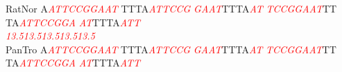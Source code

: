 \documentclass[11pt,twoside,reqno,a4paper]{article}
\begin{document}
{RatNor	A\textit{\textcolor{red}{A}}\textit{\textcolor{red}{T}}\textit{\textcolor{red}{T}}\textit{\textcolor{red}{C}}\textit{\textcolor{red}{C}}\textit{\textcolor{red}{G}}\textit{\textcolor{red}{G}}\textit{\textcolor{red}{A}}\textit{\textcolor{red}{A}}\textit{\textcolor{red}{T}}	TTTA\textit{\textcolor{red}{A}}\textit{\textcolor{red}{T}}\textit{\textcolor{red}{T}}\textit{\textcolor{red}{C}}\textit{\textcolor{red}{C}}\textit{\textcolor{red}{G}}	\textit{\textcolor{red}{G}}\textit{\textcolor{red}{A}}\textit{\textcolor{red}{A}}\textit{\textcolor{red}{T}}TTTA\textit{\textcolor{red}{A}}\textit{\textcolor{red}{T}}	\textit{\textcolor{red}{T}}\textit{\textcolor{red}{C}}\textit{\textcolor{red}{C}}\textit{\textcolor{red}{G}}\textit{\textcolor{red}{G}}\textit{\textcolor{red}{A}}\textit{\textcolor{red}{A}}\textit{\textcolor{red}{T}}TT	TA\textit{\textcolor{red}{A}}\textit{\textcolor{red}{T}}\textit{\textcolor{red}{T}}\textit{\textcolor{red}{C}}\textit{\textcolor{red}{C}}\textit{\textcolor{red}{G}}\textit{\textcolor{red}{G}}\textit{\textcolor{red}{A}}	\textit{\textcolor{red}{A}}\textit{\textcolor{red}{T}}TTTA\textit{\textcolor{red}{A}}\textit{\textcolor{red}{T}}\textit{\textcolor{red}{T}}\\
\hspace*{7\charwidth}\hspace*{1\charwidth}\textit{\textcolor{red}{13.5}}\hspace*{1\charwidth}\hspace*{10\charwidth}\textit{\textcolor{red}{13.5}}\hspace*{1\charwidth}\hspace*{10\charwidth}\textit{\textcolor{red}{13.5}}\hspace*{1\charwidth}\hspace*{1\charwidth}\hspace*{10\charwidth}\textit{\textcolor{red}{13.5}}\hspace*{1\charwidth}\hspace*{10\charwidth}\textit{\textcolor{red}{13.5}}\hspace*{1\charwidth}\\
PanTro	A\textit{\textcolor{red}{A}}\textit{\textcolor{red}{T}}\textit{\textcolor{red}{T}}\textit{\textcolor{red}{C}}\textit{\textcolor{red}{C}}\textit{\textcolor{red}{G}}\textit{\textcolor{red}{G}}\textit{\textcolor{red}{A}}\textit{\textcolor{red}{A}}\textit{\textcolor{red}{T}}	TTTA\textit{\textcolor{red}{A}}\textit{\textcolor{red}{T}}\textit{\textcolor{red}{T}}\textit{\textcolor{red}{C}}\textit{\textcolor{red}{C}}\textit{\textcolor{red}{G}}	\textit{\textcolor{red}{G}}\textit{\textcolor{red}{A}}\textit{\textcolor{red}{A}}\textit{\textcolor{red}{T}}TTTA\textit{\textcolor{red}{A}}\textit{\textcolor{red}{T}}	\textit{\textcolor{red}{T}}\textit{\textcolor{red}{C}}\textit{\textcolor{red}{C}}\textit{\textcolor{red}{G}}\textit{\textcolor{red}{G}}\textit{\textcolor{red}{A}}\textit{\textcolor{red}{A}}\textit{\textcolor{red}{T}}TT	TA\textit{\textcolor{red}{A}}\textit{\textcolor{red}{T}}\textit{\textcolor{red}{T}}\textit{\textcolor{red}{C}}\textit{\textcolor{red}{C}}\textit{\textcolor{red}{G}}\textit{\textcolor{red}{G}}\textit{\textcolor{red}{A}}	\textit{\textcolor{red}{A}}\textit{\textcolor{red}{T}}TTTA\textit{\textcolor{red}{A}}\textit{\textcolor{red}{T}}\textit{\textcolor{red}{T}}\\
}
\end{document}
